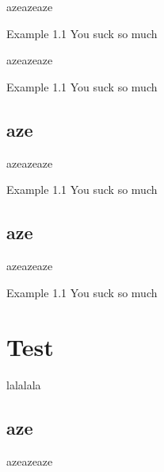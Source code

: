 \documentclass[aspectratio=169,compress]{beamer}
\begin{document}
\begin{CJK}{UTF8}{min}
\begin{frame}{azeazeaze}
\vspace{1em}
\begin{block}{Example 1.1}
You suck so much
\end{block}

\end{frame}
\begin{frame}{azeazeaze}

\vspace{1em}
\begin{block}{Example 1.1}
You suck so much
\end{block}

\end{frame}
\subsection{aze}
\begin{frame}{azeazeaze}

\vspace{1em}
\begin{block}{Example 1.1}
You suck so much
\end{block}

\end{frame}\subsection{aze}
\begin{frame}{azeazeaze}

\vspace{1em}
\begin{block}{Example 1.1}
You suck so much
\end{block}

\end{frame}

\section{Test}
\begin{frame}{lalalala}
\end{frame}
\subsection{aze}
\begin{frame}{azeazeaze}


\end{frame}
\end{CJK}
\end{document}
